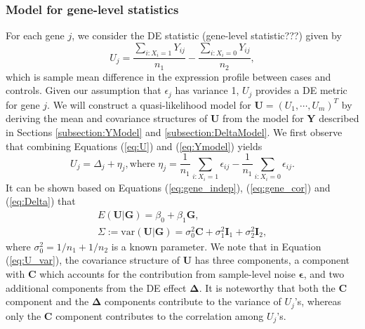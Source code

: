 \documentclass[useAMS,usenatbib, galley]{biom}
\begin{document}
	\subsubsection{Model for gene-level statistics}\label{subsection:UModel}
	For each gene $j$, we consider the DE statistic (gene-level statistic???) given by 
	\begin{equation}
		\label{eq:U}
		U_j = \dfrac{\sum_{i: X_i=1}Y_{ij}}{n_1} - \dfrac{\sum_{i: X_i=0}Y_{ij}}{n_2},
	\end{equation}
	which is sample mean difference in the expression profile between cases and controls. Given our assumption that $\epsilon_j$ has variance 1, $U_j$ provides a DE metric for gene $j$. We will construct a quasi-likelihood model for $\bm U=(U_1,\cdots,U_m)^T$ by deriving the mean and covariance structures of $\bm U$ from the model for $\bm Y$ described in Sections \ref{subsection:YModel} and \ref{subsection:DeltaModel}. We first observe that combining Equations (\ref{eq:U}) and (\ref{eq:Ymodel}) yields
	\begin{equation} 
		U_j = \Delta_j + \eta_j, \text{where } \eta_j = \dfrac{1}{n_1}\sum_{i: X_i=1}\epsilon_{ij}- \dfrac{1}{n_1}\sum_{i: X_i=0}\epsilon_{ij}.
	\end{equation}
	It can be shown based on Equations (\ref{eq:gene_indep}), (\ref{eq:gene_cor}) and (\ref{eq:Delta}) that
	\begin{gather}
		E(\bm U|\bm G) = \beta_0+\beta_1 \bm G,\label{eq:U_mean}\\
		\Sigma:=\mbox{var}(\bm U|\bm G) = \sigma_0^2\bm C + \sigma_1^2\bm I_1+\sigma_2^2\bm I_2,\label{eq:U_var}
	\end{gather}
	where $\sigma_0^2=1/n_1+1/n_2$ is a known parameter. We note that in Equation (\ref{eq:U_var}), the covariance structure of $\bm U$ has three components, a component with $\bm C$ which accounts for the contribution from sample-level noise $\bm \epsilon$, and two additional components from the DE effect $\bm \Delta$. It is noteworthy that both the $\bm C$ component and the $\bm \Delta$ components contribute to the variance of $U_j$'s, whereas only the $\bm C$ component contributes to the correlation among $U_j$'s.
	
\end{document}
